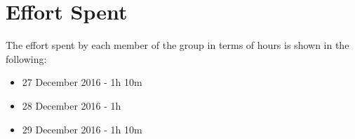 \section{Effort Spent}

The effort spent by each member of the group in terms of hours is shown in the following:

\begin{itemize}
	\item 27 December 2016 - 1h 10m
	\item 28 December 2016 - 1h
	\item 29 December 2016 - 1h 10m
\end{itemize}
